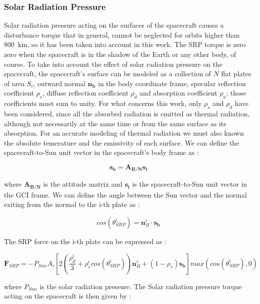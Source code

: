 \documentclass[11pt,a4paper]{report}
\begin{document}
\subsubsection{Solar Radiation Pressure}
Solar radiation pressure acting on the surfaces of the spacecraft causes a disturbance torque that in general, cannot be neglected for orbits higher than \SI{800}{\kilo\meter}, so it has been taken into account in this work.
The SRP torque is zero zero when the spacecraft is in the shadow of the Earth or any other body, of course.
To take into account the effect of solar radiation pressure on the spacecraft, the spacecraft's surface can be modeled as a collection of $N$ flat plates of area $S_{i}$, outward normal $\mathbf{n_{b}}$ in the body coordinate frame, specular reflection coefficient $\rho_s$, diffuse reflection coefficient $\rho_{d}$ and absorption coefficient $\rho_{a}$; those coefficients must sum to unity.
For what concerns this work, only $\rho_s$ and $\rho_d$ have been considered, since all the absorbed radiation is emitted as thermal radiation,  although not necessarily at the same time or from the same surface as its absorption.
For an accurate modeling of thermal radiation we must also known the absolute temerature and the emissivity of each surface.
We can define the spacecraft-to-Sun unit vector in the spacecraft's body frame as : 

\begin{equation}
 \mathbf{s_b} = \mathbf{A_{B/N}} \mathbf{s_i}
\end{equation}

where $\mathbf{A_{B/N}}$ is the attitude matrix and $\mathbf{s_i}$ is the spacecraft-to-Sun unit vector in the GCI frame.
We can define the angle between the Sun vector and the normal exiting from the normal to the i-th plate as : 

\begin{equation}
 cos(\theta_{SRP}^{i}) = \mathbf{n}_{B}^{i} \cdot \mathbf{s_b}
\end{equation}

The SRP force on the i-th plate can be expressed as : 

\begin{equation}
 \mathbf{F}_{SRP} = - P_{Sun}A_{i}\left[ 2\left( \frac{\rho_{d}^{i}}{3} + \rho_{s}^{i}cos(\theta_{SRP}^{i}) \right) \mathbf{n}_{B}^{i} + (1 -\rho_{s}) \mathbf{s_b} \right] max(cos(\theta_{SRP}^{i}),0)
\end{equation}

where $P_{Sun}$ is the solar radiation pressure.
The Solar radiation pressure torque acting on the spacecraft is then given by :
\end{document}
